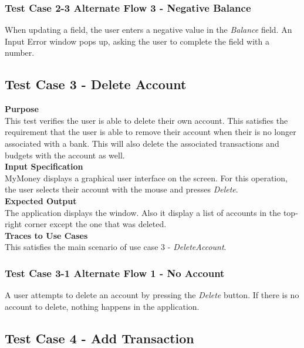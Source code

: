 \documentclass[12pt]{article}
\begin{document}
\subsubsection 
{Test Case 2-3 Alternate Flow 3 - Negative Balance}
\noindent
When updating a field, the user enters a negative value in the \textit{Balance} field. 
An Input Error window pops up, asking the user to complete the field with a number. 
            
\clearpage   


\subsection{Test Case 3 - Delete Account} \label{TC-3}
\noindent
{\bf Purpose}\\
 This test verifies the user is able to delete their own account.
 This satisfies the requirement that the user is able to remove their account when their is no longer associated
 with a bank. This will also delete the associated transactions and budgets with the account as well.\\

 \noindent
 {\bf Input Specification}\\
 MyMoney displays a graphical user interface on the screen.
 For this operation, the user selects their account with the mouse and presses \textit{Delete}.\\
                            
 \noindent
 {\bf Expected Output}\\
 The application displays the window.
 Also it display a list of accounts in the top-right corner except the one that was deleted.\\

\noindent
{\bf Traces to Use Cases}\\
This satisfies the main scenario of use case 3 - \textit{DeleteAccount}.\\

\subsubsection
{Test Case 3-1 Alternate Flow 1 - No Account}
\noindent
A user attempts to delete an account by pressing the \textit{Delete} button. If there is no account to delete, nothing happens in the application.

\clearpage 

\subsection{Test Case 4 - Add Transaction} \label{TC-4}
\end{document}
